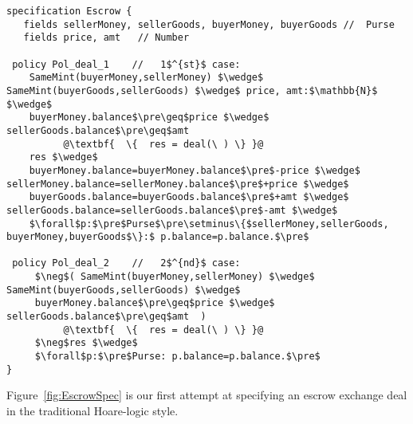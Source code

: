 \begin{figure*}[t]
\begin{lstlisting}[escapechar=@]
specification Escrow {
   fields sellerMoney, sellerGoods, buyerMoney, buyerGoods //  Purse
   fields price, amt   // Number

 policy Pol_deal_1    //   1$^{st}$ case:
    SameMint(buyerMoney,sellerMoney) $\wedge$  SameMint(buyerGoods,sellerGoods) $\wedge$ price, amt:$\mathbb{N}$  $\wedge$
    buyerMoney.balance$\pre\geq$price $\wedge$  sellerGoods.balance$\pre\geq$amt
          @\textbf{  \{  res = deal(\ ) \} }@
    res $\wedge$
    buyerMoney.balance=buyerMoney.balance$\pre$-price $\wedge$ sellerMoney.balance=sellerMoney.balance$\pre$+price $\wedge$
    buyerGoods.balance=buyerGoods.balance$\pre$+amt $\wedge$ sellerGoods.balance=sellerGoods.balance$\pre$-amt $\wedge$
    $\forall$p:$\pre$Purse$\pre\setminus\{$sellerMoney,sellerGoods, buyerMoney,buyerGoods$\}:$ p.balance=p.balance.$\pre$

 policy Pol_deal_2    //   2$^{nd}$ case:
     $\neg$( SameMint(buyerMoney,sellerMoney) $\wedge$  SameMint(buyerGoods,sellerGoods) $\wedge$
     buyerMoney.balance$\pre\geq$price $\wedge$  sellerGoods.balance$\pre\geq$amt  )
          @\textbf{  \{  res = deal(\ ) \} }@
     $\neg$res $\wedge$
     $\forall$p:$\pre$Purse: p.balance=p.balance.$\pre$
}

\end{lstlisting}
\caption{Specification of   -- First Attempt}
\label{fig:EscrowSpec}
 \end{figure*}






Figure~\ref{fig:EscrowSpec} is our first %
attempt at
specifying an escrow exchange deal in the traditional Hoare-logic
style.



